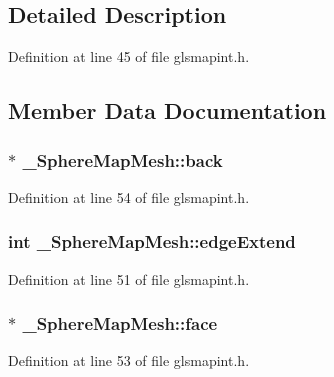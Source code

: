 \subsection{Detailed Description}


Definition at line 45 of file glsmapint.\-h.



\subsection{Member Data Documentation}
\hypertarget{struct___sphere_map_mesh_a2ea363cd5ab2463bc9c2c0de8d7f3811}{
\subsubsection[{back}]{$\ast$ \-\_\-\-Sphere\-Map\-Mesh\-::back}}\label{struct___sphere_map_mesh_a2ea363cd5ab2463bc9c2c0de8d7f3811}


Definition at line 54 of file glsmapint.\-h.

\hypertarget{struct___sphere_map_mesh_a9138869c8a44e8877b68bb1154a5a8ae}{
\subsubsection[{edge\-Extend}]{\setlength{\rightskip}{0pt plus 5cm}int \-\_\-\-Sphere\-Map\-Mesh\-::edge\-Extend}}\label{struct___sphere_map_mesh_a9138869c8a44e8877b68bb1154a5a8ae}


Definition at line 51 of file glsmapint.\-h.

\hypertarget{struct___sphere_map_mesh_ab75ee81e8d0d201e0c32cd144de796a5}{
\subsubsection[{face}]{$\ast$ \-\_\-\-Sphere\-Map\-Mesh\-::face}}\label{struct___sphere_map_mesh_ab75ee81e8d0d201e0c32cd144de796a5}


Definition at line 53 of file glsmapint.\-h.

